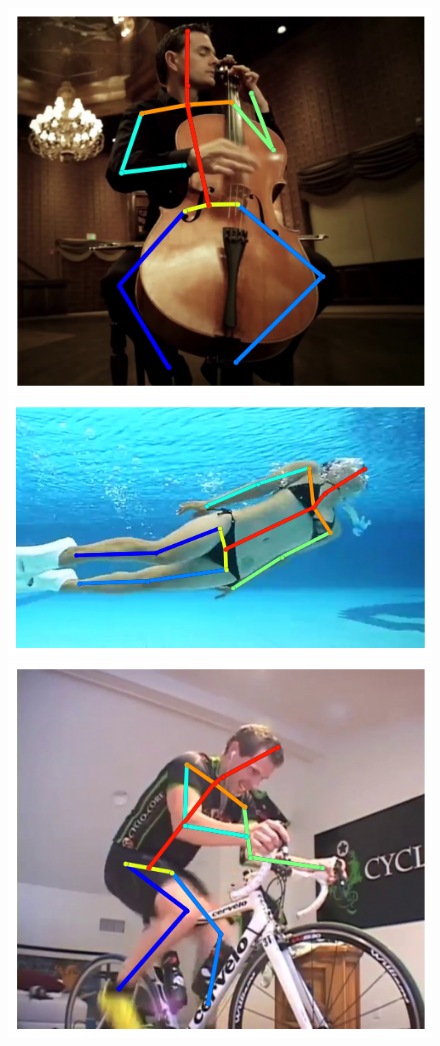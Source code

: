 \begin{figure}[t!]
    \includegraphics[height=\flowh]{resources/Human_Poses/pose/qualitative/pred-7}
    \\
    \includegraphics[height=\flowh]{resources/Human_Poses/pose/qualitative/pred-8}
    \hfill
    \includegraphics[height=\flowh]{resources/Human_Poses/pose/qualitative/pred-9}

\end{figure}
